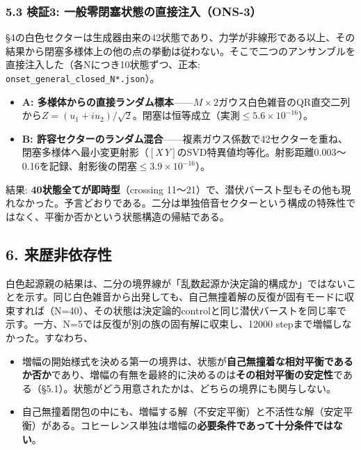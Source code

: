 \documentclass[
  a4paper,
]{ltjsarticle}
\providecommand{\tightlist}{%
  \setlength{\itemsep}{0pt}\setlength{\parskip}{0pt}}
\begin{document}
\subsubsection{5.3 検証3:
一般零閉塞状態の直接注入（ONS-3）}\label{ux691cux8a3c3-ux4e00ux822cux96f6ux9589ux585eux72b6ux614bux306eux76f4ux63a5ux6ce8ux5165ons-3}

§4の白色セクターは生成器由来の42状態であり、力学が非線形である以上、その結果から閉塞多様体上の他の点の挙動は従わない。そこで二つのアンサンブルを直接注入した（各Nにつき10状態ずつ、正本:
\texttt{onset\_general\_closed\_N*.json}）。

\begin{itemize}
\tightlist
\item
  \textbf{A:
  多様体からの直接ランダム標本}------\(M\times2\)ガウス白色雑音のQR直交二列から\(Z=(u_1+iu_2)/\sqrt2\)。閉塞は恒等成立（実測\(\le5.6\times10^{-16}\)）。
\item
  \textbf{B:
  許容セクターのランダム混合}------複素ガウス係数で42セクターを重ね、閉塞多様体へ最小変更射影（\([X\,Y]\)のSVD特異値均等化。射影距離0.003〜0.16を記録、射影後の閉塞\(\le3.9\times10^{-16}\)）。
\end{itemize}

結果: \textbf{40状態全てが即時型}（crossing
11〜21）で、潜伏バースト型もその他も現れなかった。予言どおりである。二分は単独倍音セクターという構成の特殊性ではなく、平衡か否かという状態構造の帰結である。

\subsection{6. 来歴非依存性}\label{ux6765ux6b74ux975eux4f9dux5b58ux6027}

白色起源親の結果は、二分の境界線が「乱数起源か決定論的構成か」ではないことを示す。同じ白色雑音から出発しても、自己無撞着解の反復が固有モードに収束すれば（N=40）、その状態は決定論的controlと同じ潜伏バーストを同じ率で示す。一方、N=5では反復が別の族の固有解に収束し、12000
stepまで増幅しなかった。すなわち、

\begin{itemize}
\tightlist
\item
  増幅の開始様式を決める第一の境界は、状態が\textbf{自己無撞着な相対平衡であるか否か}であり、増幅の有無を最終的に決めるのは\textbf{その相対平衡の安定性}である（§5.1）。状態がどう用意されたかは、どちらの境界にも関与しない。
\item
  自己無撞着閉包の中にも、増幅する解（不安定平衡）と不活性な解（安定平衡）がある。コヒーレンス単独は増幅の\textbf{必要条件であって十分条件ではない}。
\end{itemize}
\end{document}
